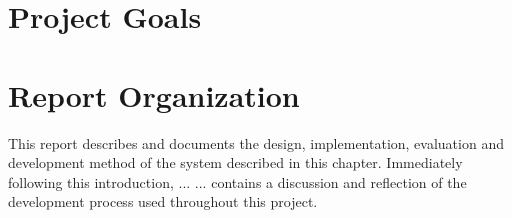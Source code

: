 \section{Project Goals}

\section{Report Organization}
This report describes and documents the design, implementation, evaluation and development method of the system described in this chapter. Immediately following this introduction,  ... \dummy ...  contains a discussion and reflection of the development process used throughout this project.